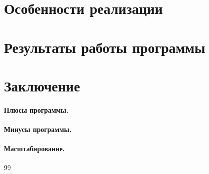 \documentclass[14pt,a4paper]{extarticle}
\begin{document}
\newpage

\section{Особенности реализации}
	
\newpage
				
\section{Результаты работы программы}
				
\newpage

\section*{Заключение}
				
\paragraph{Плюсы программы.}
				
\paragraph{Минусы программы.}
				
\paragraph{Масштабирование.} 
				
\newpage
				
\begin{thebibliography}{99}


\end{thebibliography}

\newpage
		
% 
\end{document}
